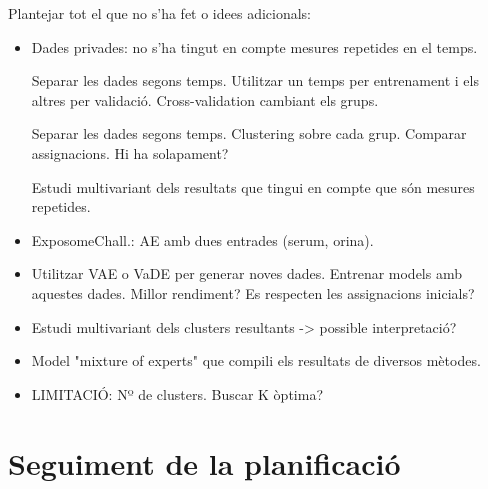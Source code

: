 \documentclass[CAT,BIB]{TFUOC}%
\newcommand{\todo}[1]{
            \begin{tcolorbox}[title=ToDo!, colback=red!5!white, colframe=red!50!black, coltext=red!50!black]
            #1
            \end{tcolorbox}}
\begin{document}
\todo{Plantejar tot el que no s'ha fet o idees adicionals:
\begin{itemize}
    \item Dades privades: no s'ha tingut en compte mesures repetides en el temps.

    Separar les dades segons temps. Utilitzar un temps per entrenament i els altres per validació. Cross-validation cambiant els grups.

    Separar les dades segons temps. Clustering sobre cada grup. Comparar assignacions. Hi ha solapament?

    Estudi multivariant dels resultats que tingui en compte que són mesures repetides.
    \item ExposomeChall.: AE amb dues entrades (serum, orina).
    \item Utilitzar VAE o VaDE per generar noves dades. Entrenar models amb aquestes dades. Millor rendiment? Es respecten les assignacions inicials?
    \item Estudi multivariant dels clusters resultants -> possible interpretació?
    \item Model "mixture of experts" que compili els resultats de diversos mètodes.
    \item LIMITACIÓ: Nº de clusters. Buscar K òptima?
\end{itemize}}

    \section{Seguiment de la planificació}
    \label{s:seguiment}
\end{document}
